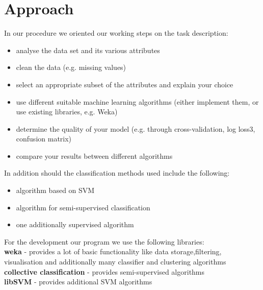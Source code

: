 \section{Approach}
\label{approach}



In our procedure we oriented our working steps on the task description:
\begin{itemize}
	\item[\textbullet] analyse the data set and its various attributes
	\item[\textbullet] clean the data (e.g. missing values)
	\item[\textbullet] select an appropriate subset of the attributes and explain your choice
	\item[\textbullet] use different suitable machine learning algorithms (either implement them, or use existing libraries, e.g. Weka)
	\item[\textbullet] determine the quality of your model (e.g. through cross-validation, log loss3, confusion matrix)
	\item[\textbullet] compare your results between different algorithms
\end{itemize}


In addition should the classification methods used include the following:
\begin{itemize}
	\item[\textbullet] algorithm based on SVM
	\item[\textbullet] algorithm for semi-supervised classification
	\item[\textbullet] one additionally supervised algorithm
\end{itemize}

For the development our program we use the following libraries:\\
\textbf{weka} - provides a lot of basic functionality like data storage,filtering, visualisation and additionally many classifier and clustering algorithms \\
\textbf{collective classification} - provides semi-supervised algorithms \\
\textbf{libSVM} - provides additional SVM algorithms \\

